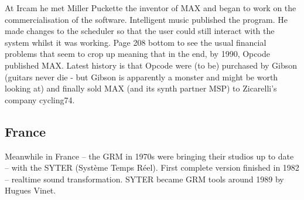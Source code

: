 At Ircam he met Miller Puckette the inventor of MAX and began to work on the commercialisation of the software.  Intelligent music published the program.  He made changes to the scheduler so that the user could still interact with the system whilst it was working.  Page 208 bottom to see the usual financial problems that seem to crop up meaning that in the end, by 1990, Opcode published MAX.  Latest history is that Opcode were (to be) purchased by Gibson (guitars never die - but Gibson is apparently a monster and might be worth looking at) and finally sold MAX (and its synth partner MSP) to Zicarelli's company cycling74.

\subsection{France}
Meanwhile in France – the GRM in 1970s were bringing their studios up to date – with the SYTER (Syst\`eme Temps R\'eel). First complete version finished in 1982 – realtime sound transformation. SYTER became GRM tools around 1989 by Hugues Vinet.



